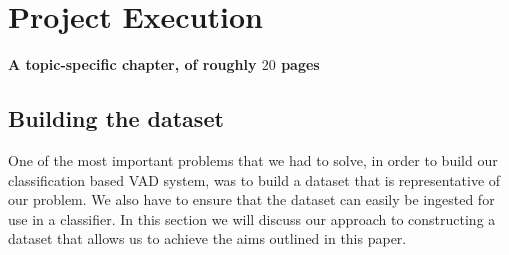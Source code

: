 \documentclass[ %
                    author={Sam Phippen},
                supervisor={Dr. Rafal Bogacz},
                     title={Real time voice activity detectors in noisy personal computing environments},
                  subtitle={},
                    degree={MEng},
                      year={2012} ]{thesis}
\begin{document}
\chapter{Project Execution}
\label{chap:execution}

{\bf A topic-specific chapter, of roughly $20$ pages} 
\vspace{1cm} 

%
%
%

\section{Building the dataset}

One of the most important problems that we had to solve, in order to build our
classification based VAD system, was to build a dataset that is representative
of our problem. We also have to ensure that the dataset can easily be ingested
for use in a classifier. In this section we will discuss our approach to
constructing a dataset that allows us to achieve the aims outlined in this
paper.
\end{document}
